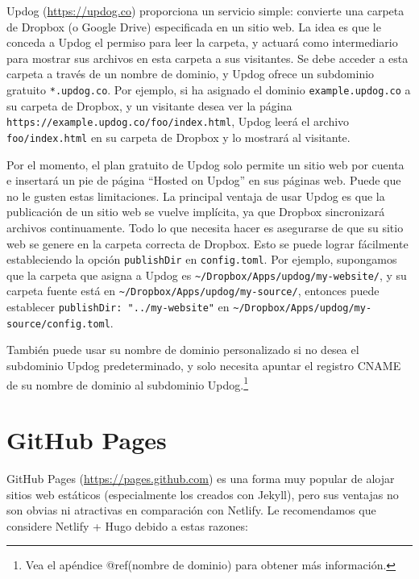 \documentclass[12pt,]{krantz}
\theoremstyle{definition}
\theoremstyle{definition}
\theoremstyle{definition}
\theoremstyle{remark}
\begin{document}
Updog (\url{https://updog.co}) proporciona un servicio
simple: convierte una carpeta de Dropbox (o Google Drive) especificada
en un sitio web. La idea es que le conceda a Updog el permiso para leer
la carpeta, y actuará como intermediario para mostrar sus archivos en
esta carpeta a sus visitantes. Se debe acceder a esta carpeta a través
de un nombre de dominio, y Updog ofrece un subdominio gratuito
\texttt{*.updog.co}. Por ejemplo, si ha asignado el dominio
\texttt{example.updog.co} a su carpeta de Dropbox, y un visitante desea
ver la página \texttt{https://example.updog.co/foo/index.html}, Updog
leerá el archivo \texttt{foo/index.html} en su carpeta de Dropbox y lo
mostrará al visitante.

Por el momento, el plan gratuito de Updog solo permite un sitio web por
cuenta e insertará un pie de página ``Hosted on Updog'' en sus páginas
web. Puede que no le gusten estas limitaciones. La principal ventaja de
usar Updog es que la publicación de un sitio web se vuelve implícita, ya
que Dropbox sincronizará archivos continuamente. Todo lo que necesita
hacer es asegurarse de que su sitio web se genere en la carpeta correcta
de Dropbox. Esto se puede lograr fácilmente estableciendo la opción
\texttt{publishDir} en \texttt{config.toml}. Por ejemplo, supongamos que
la carpeta que asigna a Updog es
\texttt{\textasciitilde{}/Dropbox/Apps/updog/my-website/}, y su carpeta
fuente está en \texttt{\textasciitilde{}/Dropbox/Apps/updog/my-source/},
entonces puede establecer \texttt{publishDir:\ "../my-website"} en
\texttt{\textasciitilde{}/Dropbox/Apps/updog/my-source/config.toml}.

También puede usar su nombre de dominio personalizado si no desea el
subdominio Updog predeterminado, y solo necesita apuntar el registro
CNAME de su nombre de dominio al subdominio Updog.\footnote{Vea el
  apéndice @ref(nombre de dominio) para obtener más información.}

\hypertarget{github-pages}{%
\section{GitHub Pages}\label{github-pages}}

GitHub Pages (\url{https://pages.github.com})  es
una forma muy popular de alojar sitios web estáticos (especialmente los
creados con Jekyll), pero sus ventajas no son obvias ni atractivas en
comparación con Netlify. Le recomendamos que considere Netlify + Hugo
debido a estas razones:
\end{document}
